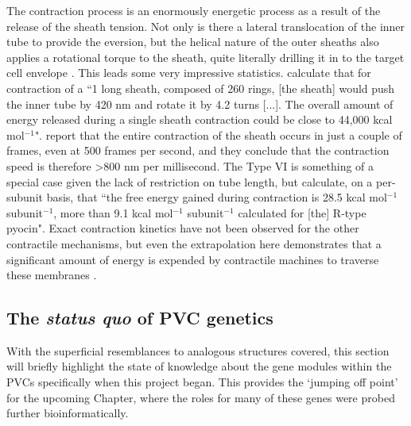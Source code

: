The contraction process is an enormously energetic process as a result of the release of the sheath tension. Not only is there a lateral translocation of the inner tube to provide the eversion, but the helical nature of the outer sheaths also applies a rotational torque to the sheath, quite literally drilling it in to the target cell envelope \citep{Kube2015}. This leads some very impressive statistics. \cite{Wang2017a} calculate that for contraction of a ``1 \um{} long sheath, composed of 260 rings, [the sheath] would push the inner tube by 420 nm and rotate it by 4.2 turns [...]. The overall amount of energy released during a single sheath contraction could be close to 44,000 kcal mol$^{-1}$". \cite{Vettiger2017} report that the entire contraction of the sheath occurs in just a couple of frames, even at 500 frames per second, and they conclude that the contraction speed is therefore \textgreater 800 nm per millisecond. The Type VI is  something of a special case given the lack of restriction on tube length, but \cite{Wang2017a} calculate, on a per-subunit basis, that ``the free energy gained during contraction is 28.5 kcal mol$^{-1}$ subunit$^{-1}$, more than 9.1 kcal mol$^{-1}$ subunit$^{-1}$ calculated for [the] R-type pyocin". Exact contraction kinetics have not been observed for the other contractile mechanisms, but even the extrapolation here demonstrates that a significant amount of energy is expended by contractile machines to traverse these membranes \citep{Brackmann2017}.


\subsection{The \emph{status quo} of PVC genetics}
With the superficial resemblances to analogous structures covered, this section will briefly highlight the state of knowledge about the gene modules within the PVCs specifically when this project began. This provides the `jumping off point' for the upcoming Chapter, where the roles for many of these genes were probed further bioinformatically.

